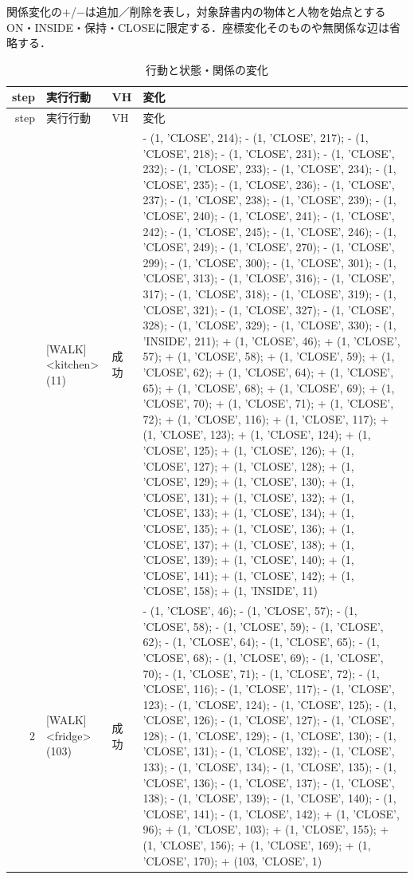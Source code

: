 関係変化の$+$/$-$は追加／削除を表し，対象辞書内の物体と人物を始点とするON・INSIDE・保持・CLOSEに限定する．座標変化そのものや無関係な辺は省略する．
{\scriptsize\setlength{\tabcolsep}{3pt}
\begin{longtable}{rp{.28\linewidth}lp{.48\linewidth}}
\caption{行動と状態・関係の変化}\label{tab:real_changes_test_task65}\\
\hline
step & 実行行動 & VH & 変化\\\hline\endfirsthead
step & 実行行動 & VH & 変化\\\hline\endhead
\hline\endfoot
1 & [WALK] \textless{}kitchen\textgreater{} (11) & 成功 & - (1, 'CLOSE', 214); - (1, 'CLOSE', 217); - (1, 'CLOSE', 218); - (1, 'CLOSE', 231); - (1, 'CLOSE', 232); - (1, 'CLOSE', 233); - (1, 'CLOSE', 234); - (1, 'CLOSE', 235); - (1, 'CLOSE', 236); - (1, 'CLOSE', 237); - (1, 'CLOSE', 238); - (1, 'CLOSE', 239); - (1, 'CLOSE', 240); - (1, 'CLOSE', 241); - (1, 'CLOSE', 242); - (1, 'CLOSE', 245); - (1, 'CLOSE', 246); - (1, 'CLOSE', 249); - (1, 'CLOSE', 270); - (1, 'CLOSE', 299); - (1, 'CLOSE', 300); - (1, 'CLOSE', 301); - (1, 'CLOSE', 313); - (1, 'CLOSE', 316); - (1, 'CLOSE', 317); - (1, 'CLOSE', 318); - (1, 'CLOSE', 319); - (1, 'CLOSE', 321); - (1, 'CLOSE', 327); - (1, 'CLOSE', 328); - (1, 'CLOSE', 329); - (1, 'CLOSE', 330); - (1, 'INSIDE', 211); + (1, 'CLOSE', 46); + (1, 'CLOSE', 57); + (1, 'CLOSE', 58); + (1, 'CLOSE', 59); + (1, 'CLOSE', 62); + (1, 'CLOSE', 64); + (1, 'CLOSE', 65); + (1, 'CLOSE', 68); + (1, 'CLOSE', 69); + (1, 'CLOSE', 70); + (1, 'CLOSE', 71); + (1, 'CLOSE', 72); + (1, 'CLOSE', 116); + (1, 'CLOSE', 117); + (1, 'CLOSE', 123); + (1, 'CLOSE', 124); + (1, 'CLOSE', 125); + (1, 'CLOSE', 126); + (1, 'CLOSE', 127); + (1, 'CLOSE', 128); + (1, 'CLOSE', 129); + (1, 'CLOSE', 130); + (1, 'CLOSE', 131); + (1, 'CLOSE', 132); + (1, 'CLOSE', 133); + (1, 'CLOSE', 134); + (1, 'CLOSE', 135); + (1, 'CLOSE', 136); + (1, 'CLOSE', 137); + (1, 'CLOSE', 138); + (1, 'CLOSE', 139); + (1, 'CLOSE', 140); + (1, 'CLOSE', 141); + (1, 'CLOSE', 142); + (1, 'CLOSE', 158); + (1, 'INSIDE', 11) \\
2 & [WALK] \textless{}fridge\textgreater{} (103) & 成功 & - (1, 'CLOSE', 46); - (1, 'CLOSE', 57); - (1, 'CLOSE', 58); - (1, 'CLOSE', 59); - (1, 'CLOSE', 62); - (1, 'CLOSE', 64); - (1, 'CLOSE', 65); - (1, 'CLOSE', 68); - (1, 'CLOSE', 69); - (1, 'CLOSE', 70); - (1, 'CLOSE', 71); - (1, 'CLOSE', 72); - (1, 'CLOSE', 116); - (1, 'CLOSE', 117); - (1, 'CLOSE', 123); - (1, 'CLOSE', 124); - (1, 'CLOSE', 125); - (1, 'CLOSE', 126); - (1, 'CLOSE', 127); - (1, 'CLOSE', 128); - (1, 'CLOSE', 129); - (1, 'CLOSE', 130); - (1, 'CLOSE', 131); - (1, 'CLOSE', 132); - (1, 'CLOSE', 133); - (1, 'CLOSE', 134); - (1, 'CLOSE', 135); - (1, 'CLOSE', 136); - (1, 'CLOSE', 137); - (1, 'CLOSE', 138); - (1, 'CLOSE', 139); - (1, 'CLOSE', 140); - (1, 'CLOSE', 141); - (1, 'CLOSE', 142); + (1, 'CLOSE', 96); + (1, 'CLOSE', 103); + (1, 'CLOSE', 155); + (1, 'CLOSE', 156); + (1, 'CLOSE', 169); + (1, 'CLOSE', 170); + (103, 'CLOSE', 1) \\

\end{longtable}}

